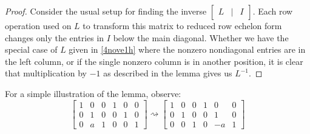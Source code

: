 \documentclass{ximera}
\begin{document}
\begin{proof}Consider the usual setup for finding the inverse $\begin{bmatrix}
L &|& I
\end{bmatrix}$.  Each row operation used on $L$ to transform this matrix to reduced row echelon form changes only the entries in $I$ below the main diagonal. Whether we have the special case of $L$ given in \ref{4nove1h} where the nonzero nondiagonal entries are in the left column, or if the single
nonzero column is in another position, it is clear that multiplication by $-1$ as described in the lemma gives us $L^{-1}$.
\end{proof}

For a simple illustration of the lemma, observe:
\begin{equation*}
\left[\begin{array}{ccc|ccc}
1 & 0 & 0 & 1 & 0 & 0 \\
0 & 1 & 0 & 0 & 1 & 0 \\
0 & a & 1 & 0 & 0 & 1
\end{array}\right]
\rightsquigarrow 
\left[\begin{array}{ccc|ccc}
1 & 0 & 0 & 1 & 0 & 0 \\
0 & 1 & 0 & 0 & 1 & 0 \\
0 & 0 & 1 & 0 & -a & 1
\end{array}\right]
\end{equation*}
\end{document}
